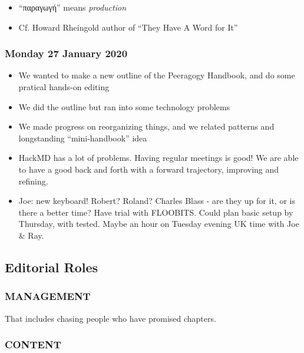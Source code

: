 \begin{itemize}
\tightlist
\item
  ``παραγωγή'' means \emph{production}
\item
  Cf. Howard Rheingold author of ``They Have A Word for It''
\end{itemize}

\hypertarget{monday-27-january-2020}{%
\subsubsection{Monday 27 January 2020}\label{monday-27-january-2020}}

\begin{itemize}
\tightlist
\item
  We wanted to make a new outline of the Peeragogy Handbook, and do some
  pratical hands-on editing
\item
  We did the outline but ran into some technology problems
\item
  We made progress on reorganizing things, and we related patterns and
  longstanding ``mini-handbook'' idea
\item
  HackMD has a lot of problems. Having regular meetings is good! We are
  able to have a good back and forth with a forward trajectory,
  improving and refining.
\item
  Joe: new keyboard! Robert? Roland? Charles Blass - are they up for it,
  or is there a better time? Have trial with FLOOBITS. Could plan basic
  setup by Thursday, with tested. Maybe an hour on Tuesday evening UK
  time with Joe \& Ray.
\end{itemize}

\hypertarget{editorial-roles}{%
\subsection{Editorial Roles}\label{editorial-roles}}

\hypertarget{management}{%
\subsubsection{MANAGEMENT}\label{management}}

That includes chasing people who have promised chapters.

\hypertarget{content}{%
\subsubsection{CONTENT}\label{content}}

